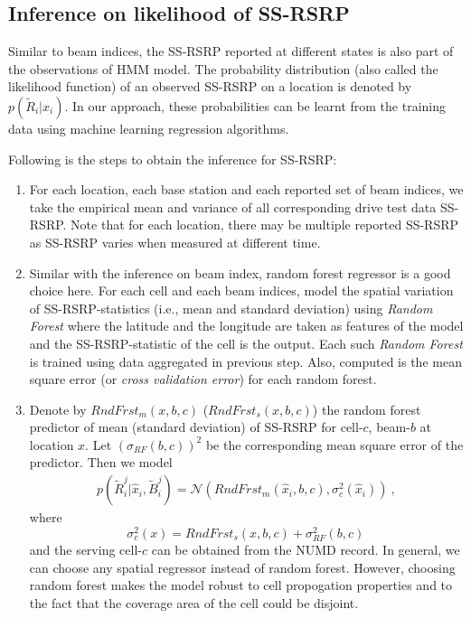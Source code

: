 \documentclass[conference, 10pt]{IEEEtran}
\begin{document}
\subsection{Inference on likelihood of SS-RSRP}
\label{sec:prob-reg}
Similar to beam indices, the SS-RSRP reported at different states
is also part of the observations of HMM model. The probability
distribution (also called the likelihood function) of an observed SS-RSRP on a location is denoted by
$p(\tilde{R}_i|\hat{x}_{i})$. In our approach, these probabilities
can be learnt from the training data using machine learning regression algorithms. 

Following is the steps to obtain the inference for SS-RSRP:

\begin{enumerate}
\item For each location, each base station and each reported set of beam indices, we
take the empirical mean and variance of all corresponding drive test data SS-RSRP. Note that for each location, there may be multiple reported SS-RSRP as SS-RSRP varies when measured at different time.

\item Similar with the inference on beam index, random forest regressor is a good choice here. For each cell and each beam indices, model the spatial variation of SS-RSRP-statistics (i.e., mean and
standard deviation) using {\em Random Forest} where the latitude and the longitude are 
taken as features of the model and the SS-RSRP-statistic  of the cell is the output. Each such {\em
Random Forest} is trained using data aggregated in previous step. Also,
computed is the mean square error (or {\em cross validation error})
for each random forest. 

\item Denote by $RndFrst_m(x,b,c)$ ($RndFrst_s(x,b,c)$) the random forest predictor of
mean (standard deviation) of SS-RSRP for cell-$c$, beam-$b$
at location $x$. Let $(\sigma_{RF}(b,c))^2$ be the corresponding
mean square error of the predictor. Then we model
\begin{align}
p(\tilde{R}^j_i|\hat{x}_{i}, \tilde{B}^j_i) =
\mathcal{N}(RndFrst_m(\hat{x}_{i},b,c), \sigma_c^2(\hat{x}_i))\ ,
\label{eqn:rndfrst}
\end{align}
where $$\sigma_c^2(x) = RndFrst_s(x,b,c) + \sigma_{RF}^2(b,c)\,$$ 
and the serving cell-$c$ can be obtained from the NUMD record. In general, we
can choose any spatial regressor instead of random forest. However, choosing
random forest makes the model robust to cell propogation properties and to the
fact that the coverage area of the cell could be disjoint.
\end{enumerate}
\end{document}
